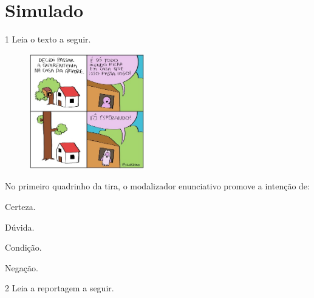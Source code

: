 \setcounter{chapter}{0}
\chapter[Simulado 1]{Simulado}

\num{1} Leia o texto a seguir.

\begin{figure}[H]
\centering\includegraphics[width=\textwidth,height=1.98077in]{./imgSAEB_6_POR/media/image34.jpeg}
\end{figure}

\noindent No primeiro quadrinho da tira, o modalizador enunciativo promove a
intenção de:

\begin{escolha}
\item Certeza. 
\item Dúvida. 
\item Condição. 
\item Negação. 
\end{escolha}



\num{2} Leia a reportagem a seguir.

